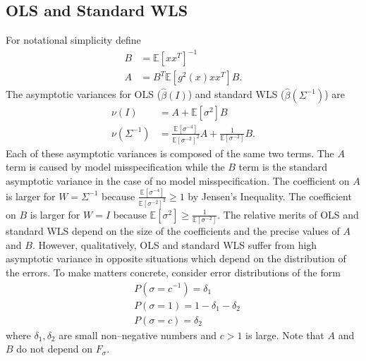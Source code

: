 \documentclass[ejs,ps,preprint]{imsart}
\numberwithin{equation}{section}
\theoremstyle{plain}
\newcommand{\E}{\mathbb{E}}
\def\E{\mathbb{E}}
\begin{document}
\subsection{OLS and Standard WLS}
\label{sec:olswls}
For notational simplicity define
\begin{align*}
B &= \E[xx^T]^{-1}\\
A &= B^T\E[g^2(x)xx^T]B.
\end{align*}
The asymptotic variances for OLS ($\widehat{\beta}(I)$) and standard WLS ($\widehat{\beta}(\Sigma^{-1})$) are
\begin{align*}
\nu(I) &= A + \E[\sigma^2]B\\
\nu(\Sigma^{-1}) &= \frac{\E[\sigma^{-4}]}{\E[\sigma^{-2}]^2}A + \frac{1}{\E[\sigma^{-2}]}B.
\end{align*}
Each of these asymptotic variances is composed of the same two terms. The $A$ term is caused by model misspecification while the $B$ term is the standard asymptotic variance in the case of no model misspecification. The coefficient on $A$ is larger for $W=\Sigma^{-1}$ because $\frac{\E[\sigma^{-4}]}{\E[\sigma^{-2}]^2} \geq 1$ by Jensen's Inequality. The coefficient on $B$ is larger for $W=I$ because $\E[\sigma^2] \geq \frac{1}{\E[\sigma^{-2}]}$. The relative merits of OLS and standard WLS depend on the size of the coefficients and the precise values of $A$ and $B$. However, qualitatively, OLS and standard WLS suffer from high asymptotic variance in opposite situations which depend on the distribution of the errors. To make matters concrete, consider error distributions of the form
\begin{align*}
&P(\sigma=c^{-1}) = \delta_1\\
&P(\sigma=1) = 1 - \delta_1 - \delta_2\\
&P(\sigma=c) = \delta_2
\end{align*}
where $\delta_1,\delta_2$ are small non--negative numbers and $c > 1$ is large. Note that $A$ and $B$ do not depend on $F_\sigma$. 
\end{document}
